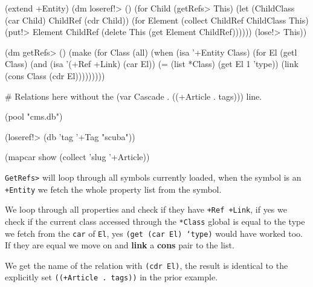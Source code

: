 \begin{wideverbatim}
(extend +Entity)
(dm loseref!> ()
    (for Child (getRefs> This) 
         (let (ChildClass (car Child) ChildRef (cdr Child)) 
           (for Element (collect ChildRef ChildClass This)
                (put!> Element ChildRef (delete This (get Element ChildRef))))))
    (lose!> This))

(dm getRefs> ()
    (make 
     (for Class (all)
          (when (isa '+Entity Class) 
            (for El (getl Class) 
                 (and 
                  (isa '(+Ref +Link) (car El))
                  (= (list *Class) (get El 1 'type))
                  (link (cons Class (cdr El)))))))))

\end{wideverbatim}

\begin{wideverbatim}


# Relations here without the (var Cascade . ((+Article . tags))) line.

(pool "cms.db")

(loseref!> (db 'tag '+Tag "scuba"))

(mapcar show (collect 'slug '+Article))
\end{wideverbatim}

\texttt{GetRefs>} will loop through all symbols currently loaded, when
the symbol is an \texttt{+Entity} we fetch the whole property list
from the symbol.

We loop through all properties and check if they have \texttt{+Ref
  +Link}, if yes we check if the current class accessed through the
\texttt{*Class} global is equal to the type we fetch from the
\texttt{car} of \texttt{El}, yes \texttt{(get (car El) ‘type)} would
have worked too. If they are equal we move on and \textbf{link} a
\textbf{cons} pair to the list.

We get the name of the relation with \texttt{(cdr El)}, the result is
identical to the explicitly set \texttt{((+Article . tags))} in the
prior example.

